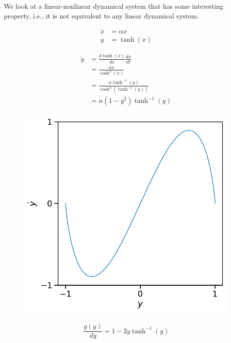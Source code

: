 \documentclass{article}
\theoremstyle{definition}
\theoremstyle{remark}
\begin{document}
We look at a linear-nonlinear dynamical system that has some interesting property, i.e., it is not equivalent to any linear dynamical system.

\begin{align}
\dot x &= \alpha x\\
       y &= \tanh(x)
\end{align}

\begin{align*}
\dot y &= \frac{d \tanh(x)}{dx}\frac{dx}{dt}\\
&= \frac{\alpha x}{\cosh^2(x)}\\
&=  \frac{\alpha \tanh^{-1}(y)}{\cosh^2( \tanh^{-1}(y))}\\
&= \alpha(1-y^2) \tanh^{-1}(y)
\end{align*}




\begin{figure}[H]
 \centering
 \includegraphics[width=0.99\textwidth]{figs/tanh_ydot.pdf}
 \caption{}
 \label{fig:tanh_ydot}
\end{figure}


\begin{equation}
\frac{g(y)}{dy} = 1 - 2 y \tanh^{-1}(y)
\end{equation}
\end{document}
